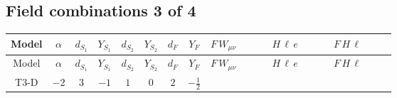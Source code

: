 \documentclass[8pt]{article}
\begin{document}
\begin{landscape}
\subsection*{Field combinations 3 of 4}
\begin{longtable}{@{}cccccccc >{\raggedright\arraybackslash}p{0.21\linewidth} >{\raggedright\arraybackslash}p{0.21\linewidth} >{\raggedright\arraybackslash}p{0.21\linewidth}@{}}
\toprule
Model & $\alpha$ & $d_{S_1}$ & $Y_{S_1}$ & $d_{S_2}$ & $Y_{S_2}$ & $d_F$ & $Y_F$ & $F\,W_{\mu\nu}$ & $H\,\ell\,e$ & $F\,H\,\ell$ \\
\midrule
\endfirsthead
\toprule
Model & $\alpha$ & $d_{S_1}$ & $Y_{S_1}$ & $d_{S_2}$ & $Y_{S_2}$ & $d_F$ & $Y_F$ & $F\,W_{\mu\nu}$ & $H\,\ell\,e$ & $F\,H\,\ell$ \\
\midrule
\endhead
T3-D & $-2$ & $3$ & $-1$ & $1$ & $0$ & $2$ & $-\frac{1}{2}$ & \scriptsize\adjustbox{max width=\linewidth}{$\begin{gathered} -\frac{1}{2} \hbar  \log \left(\frac{\bar{\mu}^{2}}{M_F^2}\right) \left(W_{\mu _1\mu _2}^{A_1}\right){}^2\end{gathered}$} & \scriptsize\adjustbox{max width=\linewidth}{$\begin{gathered} +\frac{\sqrt{3} \hbar  \overline{y_{1,i_3,r_1}} \overline{L_{a_1,i_2}}\, P_R\, e_{i_1} H_{a_1} y_{1,i_2,r_1} Y_{e,i_3,i_1}}{4 \epsilon } \\ -\frac{1}{8} \sqrt{3} \hbar  \overline{y_{1,i_3,r_1}} \overline{L_{a_1,i_2}}\, P_R\, e_{i_1} H_{a_1} y_{1,i_2,r_1} Y_{e,i_3,i_1} \\ +\frac{\hbar  \overline{y_{2,i_3,r_1}} \overline{L_{a_1,i_2}}\, P_R\, e_{i_1} H_{a_1} y_{2,i_2,r_1} Y_{e,i_3,i_1}}{4 \epsilon }\end{gathered}$} & \scriptsize\adjustbox{max width=\linewidth}{$\begin{gathered} +\frac{2 \hbar  \log \left(\frac{M_F^2}{m_2^2}\right) \overline{y_{1,i_1,r_1}} \overline{y_{2,i_2,r_1}} L_{a_4,i_2}{}^T\, C\, P_L\, L_{a_2,i_1} H_{a_1} H_{a_3} m_2^2 \lambda_5 \epsilon_{a_1,a_2} \epsilon_{a_3,a_4} M_F^3}{\sqrt{3} \left(M_F^2-m_1^2\right) \left(M_F^2-m_2^2\right) \left(m_1^2-m_2^2\right)} \\ -\frac{2 \hbar  \log \left(\frac{M_F^2}{m_1^2}\right) \overline{y_{1,i_1,r_1}} \overline{y_{2,i_2,r_1}} L_{a_4,i_2}{}^T\, C\, P_L\, L_{a_2,i_1} H_{a_1} H_{a_3} m_1^2 \lambda_5 \epsilon_{a_1,a_2} \epsilon_{a_3,a_4} M_F^3}{\sqrt{3} \left(M_F^2-m_1^2\right) \left(M_F^2-m_2^2\right) \left(m_1^2-m_2^2\right)} \\ +\frac{2 \hbar  \log \left(\frac{M_F^2}{m_2^2}\right) \overline{\lambda_5} \overline{L_{a_3,i_1}}\, C\, P_R\, \overline{L_{a_4,i_2}}{}^T m_2^2 y_{1,i_1,r_1} y_{2,i_2,r_1} \epsilon_{a_1,a_3} \epsilon_{a_2,a_4} H_{a_1}{}^{\dagger } H_{a_2}{}^{\dagger } M_F^3}{\sqrt{3} \left(M_F^2-m_1^2\right) \left(M_F^2-m_2^2\right) \left(m_1^2-m_2^2\right)}\end{gathered}$} \\

\end{longtable}
\end{landscape}
\end{document}
